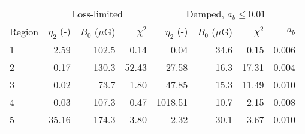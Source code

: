 \begin{tabular}{@{} l rrr rrrr @{}}
\toprule
{} & \multicolumn{3}{c}{Loss-limited}
   & \multicolumn{4}{c}{Damped, $a_b \leq 0.01$} \\
\cmidrule(lr){2-4} \cmidrule(l){5-8}
Region & $\eta_2$ (-) & $B_0$ ($\mu$G) & $\chi^2$
       & $\eta_2$ (-) & $B_0$ ($\mu$G) & $\chi^2$ & $a_b$ \\
\midrule
1 & 2.59 & 102.5 & 0.14 & 0.04 & 34.6 & 0.15 & 0.006 \\
2 & 0.17 & 130.3 & 52.43 & 27.58 & 16.3 & 17.31 & 0.004 \\
3 & 0.02 & 73.7 & 1.80 & 47.85 & 15.3 & 11.49 & 0.010 \\
4 & 0.03 & 107.3 & 0.47 & 1018.51 & 10.7 & 2.15 & 0.008 \\
5 & 35.16 & 174.3 & 3.80 & 2.32 & 30.1 & 3.67 & 0.010 \\
\bottomrule
\end{tabular}

